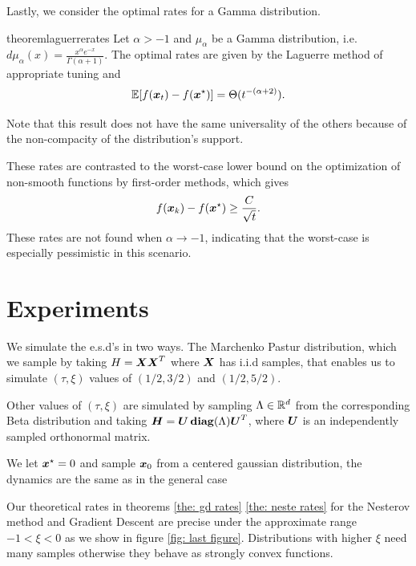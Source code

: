\documentclass{article}
\begin{document}
Lastly, we consider the optimal rates for a Gamma distribution.

\begin{restatable}{theorem}{laguerrerates}
Let $\alpha>-1$ and $\mu_\alpha$ be a Gamma distribution, i.e. $d\mu_\alpha(x)=\frac{x^\alpha e^{-x}}{\Gamma(\alpha+1)}$. The optimal rates are given by the Laguerre method of appropriate tuning and
\begin{equation}
    \mathbb{E}[f({\boldsymbol x}_t)-f({\boldsymbol x}^\star)]=\Theta(t^{-(\alpha+2)}) . 
\end{equation}
\end{restatable}
Note that this result does not have the same universality of the others because of the non-compacity of the distribution's support.

These rates are contrasted  to the worst-case lower bound on the optimization of non-smooth functions by first-order methods, which gives
\begin{equation*}
    f({\boldsymbol x}_k)-f({\boldsymbol x}^\star)\geq\frac{C}{\sqrt{t}} .
\end{equation*}
These rates are not found when $\alpha\rightarrow-1$, indicating that the worst-case is especially pessimistic in this scenario.


\section{Experiments}

We simulate the e.s.d's  in two ways. The Marchenko Pastur distribution, which we sample by taking $H={\boldsymbol X}{\boldsymbol X}^T$ where ${\boldsymbol X}$ has i.i.d samples, that enables us to simulate $(\tau,\xi)$ values of $(1/2,3/2)$ and $(1/2,5/2)$. 

Other values of $(\tau,\xi)$ are simulated by sampling $\Lambda \in {\mathbb R}^d$ from the corresponding Beta distribution and taking ${\boldsymbol H}={\boldsymbol U}\operatorname*{\mathbf{diag}}(\Lambda){\boldsymbol U}^T$, where ${\boldsymbol U}$ is an independently sampled orthonormal matrix. 

We let ${\boldsymbol x}^\star=0$ and sample ${\boldsymbol x}_0$ from a centered gaussian distribution, the dynamics are the same as in the general case


Our theoretical rates in theorems \ref{the: gd rates} \ref{the: neste rates} for the Nesterov method and Gradient Descent are precise under the approximate  range $-1<\xi<0$  as we show in figure \ref{fig: last figure}. Distributions with higher $\xi$ need many samples otherwise they behave as strongly convex functions. 
\end{document}
